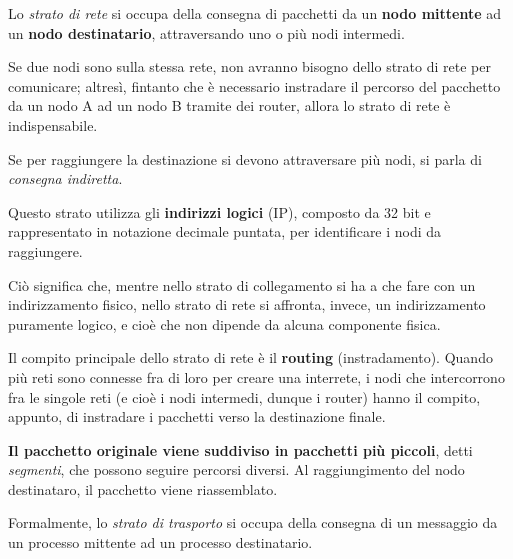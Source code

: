         
            Lo \textit{strato di rete} si occupa della consegna di pacchetti da un \textbf{nodo mittente} ad un \textbf{nodo destinatario}, attraversando uno o più nodi intermedi. 
            
            Se due nodi sono sulla stessa rete, non avranno bisogno dello strato di rete per comunicare; altresì, fintanto che è necessario instradare il percorso del pacchetto da un nodo A ad un nodo B tramite dei router, allora lo strato di rete è indispensabile.
            
            \vspace{3mm}
            
            Se per raggiungere la destinazione si devono attraversare più nodi, si parla di \textit{consegna indiretta}.
            
            \vspace{3mm}
            
            Questo strato utilizza gli \textbf{indirizzi logici} (IP), composto da 32 bit e rappresentato in notazione decimale puntata, per identificare i nodi da raggiungere. 
            
            Ciò significa che, mentre nello strato di collegamento si ha a che fare con un indirizzamento fisico, nello strato di rete si affronta, invece, un indirizzamento puramente logico, e cioè che non dipende da alcuna componente fisica.
            
            \vspace{3mm}
            
            Il compito principale dello strato di rete è il \textbf{routing} (instradamento). Quando più reti sono connesse fra di loro per creare una interrete, i nodi che intercorrono fra le singole reti (e cioè i nodi intermedi, dunque i router) hanno il compito, appunto, di instradare i pacchetti verso la destinazione finale. 
            
            \textbf{Il pacchetto originale viene suddiviso in pacchetti più piccoli}, detti \textit{segmenti}, che possono seguire percorsi diversi. Al raggiungimento del nodo destinataro, il pacchetto viene riassemblato.
        
        
            Formalmente, lo \textit{strato di trasporto} si occupa della consegna di un messaggio da un processo mittente ad un processo destinatario. 
            
